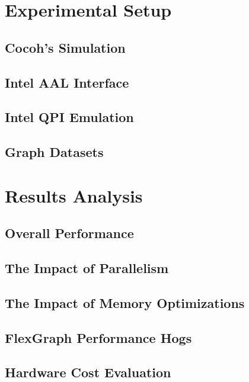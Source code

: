 \section{Experimental Setup}

\subsection{Cocoh's Simulation}

\subsection{Intel AAL Interface}

\subsection{Intel QPI Emulation}

\subsection{Graph Datasets}

\section{Results Analysis}

\subsection{Overall Performance}

\subsection{The Impact of Parallelism}

\subsection{The Impact of Memory Optimizations}

\subsection{FlexGraph Performance Hogs}

\subsection{Hardware Cost Evaluation}
